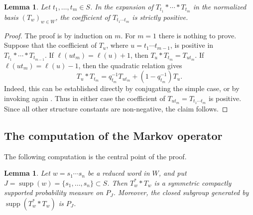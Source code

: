 \documentclass[12pt,a4paper]{amsproc}
\newtheorem{lemma}[theorem]{Lemma}
\theoremstyle{definition}
\DeclareMathOperator{\supp}{supp}
\begin{document}
\begin{lemma}\label{lem:positive-group-product}
Let $t_1,\ldots,t_m\in S$. In the expansion of $T_{t_1}*\cdots*T_{t_m}$ in the normalized basis $(T_w)_{w\in W}$, the coefficient of $T_{t_1\cdots t_m}$ is strictly positive.
\end{lemma}

\begin{proof}
The proof is by induction on $m$. For $m=1$ there is nothing to prove. Suppose that the coefficient of $T_u$, where $u=t_1\cdots t_{m-1}$, is positive in $T_{t_1}*\cdots*T_{t_{m-1}}$. If $\ell(ut_m)=\ell(u)+1$, then $T_u*T_{t_m}=T_{ut_m}$. If $\ell(ut_m)=\ell(u)-1$, then the quadratic relation gives
\[
        T_u*T_{t_m}=q_{t_m}^{-1}T_{ut_m}+(1-q_{t_m}^{-1})T_u.
\]
Indeed, this can be established directly by conjugating the simple case, or by invoking  again \cite[Proposition~19.1.1]{Davis}. Thus in either case the coefficient of $T_{ut_m}=T_{t_1\cdots t_m}$ is positive. Since all other structure constants are non-negative, the claim follows.
\end{proof}


\subsection{The computation of the Markov operator}
\label{sec:markov-computation}

The following computation is the central point of the proof.

\begin{lemma}\label{lem:hecke-markov-parabolic}
Let $w=s_1\cdots s_n$ be a reduced word in $W$, and put $J=\supp(w)=\{s_1,\ldots,s_n\}\subset S$. Then $T_w^**T_w$ is a symmetric compactly supported probability measure on $P_J$. Moreover, the closed subgroup generated by $\supp(T_w^**T_w)$ is $P_J$.
\end{lemma}
\end{document}
